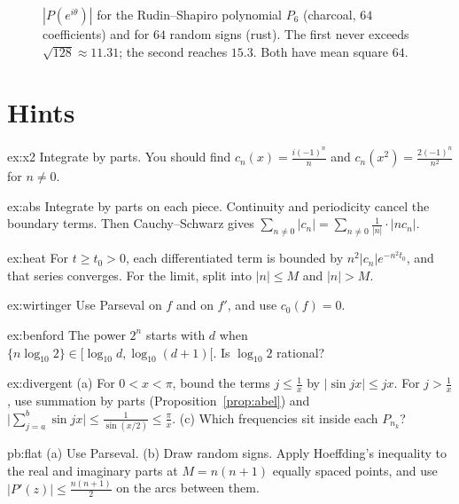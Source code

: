\begin{figure}[ht]
\centering
{}
\caption{$|P(e^{i\theta})|$ for the Rudin--Shapiro polynomial $P_6$ (charcoal, $64$ coefficients) and for $64$ random signs (rust).
The first never exceeds $\sqrt{128}\approx11.31$; the second reaches $15.3$. Both have mean square $64$.}
\label{fig:rudin}
\end{figure}

\section{Hints}

\begin{hint}{ex:x2}
Integrate by parts. You should find $c_n(x)=\frac{i(-1)^n}n$ and $c_n(x^2)=\frac{2(-1)^n}{n^2}$ for $n\ne0$.
\end{hint}
\begin{hint}{ex:abs}
Integrate by parts on each piece. Continuity and periodicity cancel the boundary terms. Then Cauchy--Schwarz gives $\sum_{n\ne0}|c_n|=\sum_{n\ne0}\frac1{|n|}\cdot|nc_n|$.
\end{hint}
\begin{hint}{ex:heat}
For $t\ge t_0>0$, each differentiated term is bounded by $n^2|c_n|e^{-n^2t_0}$, and that series converges. For the limit, split into $|n|\le M$ and $|n|>M$.
\end{hint}
\begin{hint}{ex:wirtinger}
Use Parseval on $f$ and on $f'$, and use $c_0(f)=0$.
\end{hint}
\begin{hint}{ex:benford}
The power $2^n$ starts with $d$ when $\{n\log_{10}2\}\in\bigl[\log_{10}d,\log_{10}(d+1)\bigr[$. Is $\log_{10}2$ rational?
\end{hint}
\begin{hint}{ex:divergent}
(a) For $0<x<\pi$, bound the terms $j\le\frac1x$ by $|\sin jx|\le jx$. For $j>\frac1x$, use summation by parts (Proposition~\ref{prop:abel}) and $\bigl|\sum_{j=a}^b\sin jx\bigr|\le\frac1{\sin(x/2)}\le\frac\pi x$. (c) Which frequencies sit inside each $P_{n_k}$?
\end{hint}

\begin{hint}{pb:flat}
(a) Use Parseval. (b) Draw random signs. Apply Hoeffding's inequality to the real and imaginary parts at $M=n(n+1)$ equally spaced points, and use $|P'(z)|\le\frac{n(n+1)}2$ on the arcs between them.
\end{hint}

